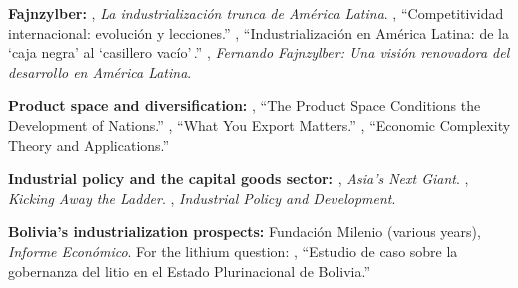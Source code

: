 \documentclass[../structural_economics_book.tex]{subfiles}
\begin{document}
\textbf{Fajnzylber:} \citet{fajnzylber1983industrializacion}, \textit{La industrializaci\'{o}n trunca de Am\'{e}rica Latina}. \citet{fajnzylber1988competitividad}, ``Competitividad internacional: evoluci\'{o}n y lecciones.'' \citet{fajnzylber1990industrializacion}, ``Industrializaci\'{o}n en Am\'{e}rica Latina: de la `caja negra' al `casillero vac\'{i}o'\,.'' \citet{cepal2006fernando}, \textit{Fernando Fajnzylber: Una visi\'{o}n renovadora del desarrollo en Am\'{e}rica Latina}.

\textbf{Product space and diversification:} \citet{hidalgo2007product}, ``The Product Space Conditions the Development of Nations.'' \citet{hausmann2007what}, ``What You Export Matters.'' \citet{hidalgo2021economic}, ``Economic Complexity Theory and Applications.''

\textbf{Industrial policy and the capital goods sector:} \citet{amsden1989asia}, \textit{Asia's Next Giant}. \citet{chang2002kicking}, \textit{Kicking Away the Ladder}. \citet{cimoli2009industrial}, \textit{Industrial Policy and Development}.

\textbf{Bolivia's industrialization prospects:} Fundaci\'{o}n Milenio (various years), \textit{Informe Econ\'{o}mico}. For the lithium question: \citet{obaya2019estudio}, ``Estudio de caso sobre la gobernanza del litio en el Estado Plurinacional de Bolivia.''
\end{document}
